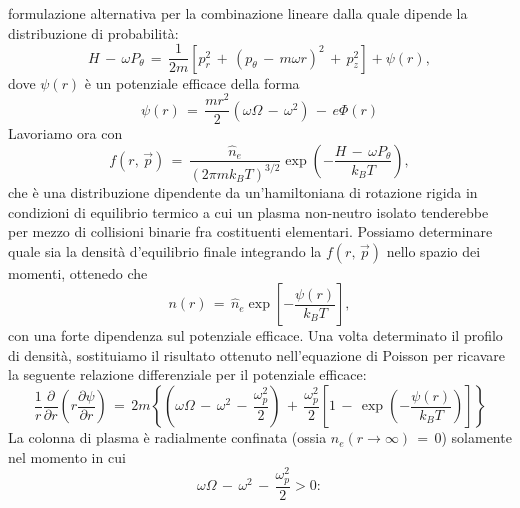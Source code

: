 formulazione alternativa per la combinazione lineare dalla quale dipende la distribuzione di probabilità:
\begin{equation}
    H\,-\,\omega P_\theta\,=\,\frac{1}{2m}\left[p_r^2\,+\,\left(p_\theta\,-\,m\omega r\right)^2\,+\,p_z^2\right] + \psi \left(r\right),
    \label{equation: lincomb_alternative}
\end{equation}
dove $\psi\left(r\right)$ è un potenziale efficace della forma
\begin{equation}
    \psi \left(r\right)\,=\,\frac{mr^2}{2}\left(\omega\Omega\,-\,\omega^2\right)\,-\,e\Phi\left(r\right)
    \label{equation: effective_potential}
\end{equation}
Lavoriamo ora con 
\begin{equation}
    f\left(r,\,\vec{p}\right)\,=\,\frac{\hat{n}_e}{\left(2\pi mk_B T\right)^{3/2}}\exp{\left(-\frac{H\,-\,\omega P_\theta}{k_BT}\right)}, 
    \label{equation: dist_termeq}
\end{equation}
che è una distribuzione dipendente da un'hamiltoniana di rotazione rigida in condizioni di equilibrio termico a cui un plasma non-neutro isolato 
tenderebbe per mezzo di collisioni binarie fra costituenti elementari. Possiamo determinare quale sia la densità d'equilibrio 
finale integrando la $f\left(r,\,\vec{p}\right)$ nello spazio dei momenti, ottenedo che 
\begin{equation}
    n\left(r\right)\,=\,\hat{n}_e \exp{\left[-\frac{\psi\left(r\right)}{k_B T}\right]},
    \label{equation: equilibrium_dens}
\end{equation}
con una forte dipendenza sul potenziale efficace. Una volta determinato il profilo di densità, sostituiamo il risultato ottenuto 
nell'equazione di Poisson per ricavare la seguente relazione differenziale per il potenziale efficace:
\begin{equation}
    \frac{1}{r}\frac{\partial}{\partial r}\left(r\frac{\partial \psi}{\partial r}\right)\,=\,2m\left\{\left(\omega\Omega\,-\,\omega^2\,-\,\frac{\omega_p^2}{2}\right)\,+\,\frac{\omega_p^2}{2}\left[1\,-\,\exp{\left(-\frac{\psi\left(r\right)}{k_BT}\right)}\right]\right\}
    \label{equation: PoissonPsi}
\end{equation}
La colonna di plasma è radialmente confinata (ossia $n_e\left(r \rightarrow \infty\right)\,=\,0$) solamente nel momento in cui 
\begin{equation}
    \omega\Omega\,-\,\omega^2\,-\,\frac{\omega_p^2}{2} > 0:
    \label{equation: condizione_eqtermico}
\end{equation}
